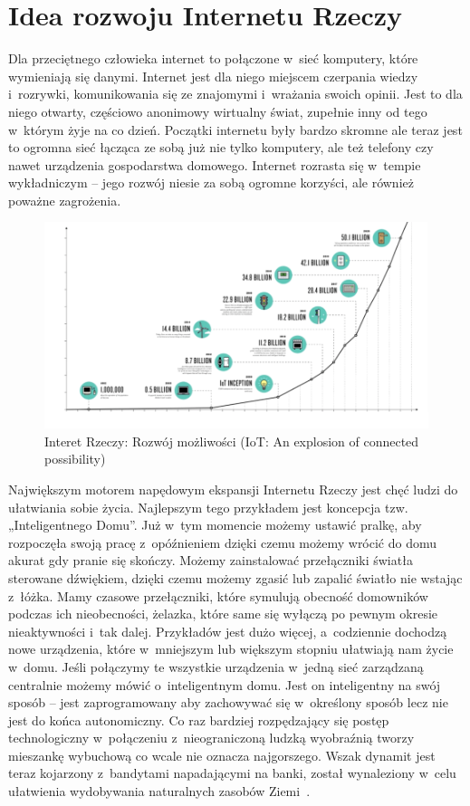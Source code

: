 \documentclass{xmgr}
\begin{document}
\section{Idea rozwoju Internetu Rzeczy}
	Dla przeciętnego człowieka internet to połączone w~sieć komputery, które wymieniają się danymi. Internet jest dla niego miejscem czerpania wiedzy i~rozrywki, komunikowania się ze znajomymi i~wrażania swoich opinii. Jest to dla niego otwarty, częściowo anonimowy wirtualny świat, zupełnie inny od tego w~którym żyje na co dzień. Początki internetu były bardzo skromne ale teraz jest to ogromna sieć łącząca ze sobą już nie tylko komputery, ale też telefony czy nawet urządzenia gospodarstwa domowego. Internet rozrasta się w~tempie wykładniczym – jego rozwój niesie za sobą ogromne korzyści, ale również poważne zagrożenia.
\begin{figure}[h]
\centering
\includegraphics[width=12cm]{m_exp}
\caption{Interet Rzeczy: Rozwój możliwości (IoT: An explosion of connected possibility)~\cite{Nsr:2015:CMC}}
\label{fig:exp}
\end{figure} 
	Największym motorem napędowym ekspansji Internetu Rzeczy jest chęć ludzi do ułatwiania sobie życia. Najlepszym tego przykładem jest koncepcja tzw. „Inteligentnego Domu”. Już w~tym momencie możemy ustawić pralkę, aby rozpoczęła swoją pracę z~opóźnieniem dzięki czemu możemy wrócić do domu akurat gdy pranie się skończy. Możemy zainstalować przełączniki światła sterowane dźwiękiem, dzięki czemu możemy zgasić lub zapalić światło nie wstając z~łóżka. Mamy czasowe przełączniki, które symulują obecność domowników podczas ich nieobecności, żelazka, które same się wyłączą po pewnym okresie nieaktywności i~tak dalej. Przykładów jest dużo więcej, a~codziennie dochodzą nowe urządzenia, które w~mniejszym lub większym stopniu ułatwiają nam życie w~domu. Jeśli połączymy te wszystkie urządzenia w~jedną sieć zarządzaną centralnie możemy mówić o~inteligentnym domu. Jest on inteligentny na swój sposób – jest zaprogramowany aby zachowywać się w~określony sposób lecz nie jest do końca autonomiczny. Co raz bardziej rozpędzający się postęp technologiczny w~połączeniu z~nieograniczoną ludzką wyobraźnią tworzy mieszankę wybuchową co wcale nie oznacza najgorszego. Wszak dynamit jest teraz kojarzony z~bandytami napadającymi na banki, został wynaleziony w~celu ułatwienia wydobywania naturalnych zasobów Ziemi~\cite{Rethinking}.
\end{document}
